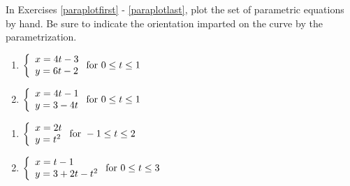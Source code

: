 \documentclass{ximera}
\begin{document}
	\author{Stitz-Zeager}


In Exercises \ref{paraplotfirst} - \ref{paraplotlast}, plot the set of parametric equations by hand. Be sure to indicate the orientation imparted on the curve by the parametrization.  

\begin{multicols}{2} \raggedcolumns 

\begin{enumerate}

\item ${\displaystyle \left\{ \begin{array}{l} x = 4t-3 \\ y = 6t-2 \end{array} \right. \vspace{.25in} \mbox{for } 0 \leq t \leq 1}$ \label{paraplotfirst}
\item ${\displaystyle \left\{ \begin{array}{l} x = 4t-1 \\ y = 3-4t \end{array} \right. \vspace{.25in} \mbox{for } 0 \leq t \leq 1}$

\setcounter{HW}{\value{enumi}}
\end{enumerate}
\end{multicols}

\begin{multicols}{2} \raggedcolumns 
\begin{enumerate}
\setcounter{enumi}{\value{HW}}
\item ${\displaystyle \left\{ \begin{array}{l} x = 2t \\ y = t^2 \end{array} \right. \vspace{.25in} \mbox{for } -1 \leq t \leq 2}$
\item ${\displaystyle \left\{ \begin{array}{l} x = t-1 \\ y = 3+2t-t^2 \end{array} \right. \vspace{.25in} \mbox{for } 0 \leq t \leq 3}$

\setcounter{HW}{\value{enumi}}
\end{enumerate}
\end{multicols}
\end{document}
